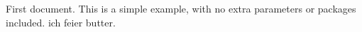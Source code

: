 \documentclass{article}
\begin{document}
First document. This is a simple example, with no
extra parameters or packages included.
ich feier butter.
\end{document}
